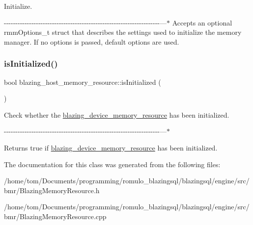 Initialize. 

-\/-\/-\/-\/-\/-\/-\/-\/-\/-\/-\/-\/-\/-\/-\/-\/-\/-\/-\/-\/-\/-\/-\/-\/-\/-\/-\/-\/-\/-\/-\/-\/-\/-\/-\/-\/-\/-\/-\/-\/-\/-\/-\/-\/-\/-\/-\/-\/-\/-\/-\/-\/-\/-\/-\/-\/-\/-\/-\/-\/-\/-\/-\/-\/-\/-\/-\/-\/---$\ast$ Accepts an optional rmm\+Options\+\_\+t struct that describes the settings used to initialize the memory manager. If no {\ttfamily options} is passed, default options are used.\mbox{\label{classblazing__host__memory__resource_a863f02392dbfc839f87b8b3a2a6cff9e}} 
\subsubsection{\texorpdfstring{is\+Initialized()}{isInitialized()}}
{\footnotesize\ttfamily bool blazing\+\_\+host\+\_\+memory\+\_\+resource\+::is\+Initialized (\begin{DoxyParamCaption}{ }\end{DoxyParamCaption})}



Check whether the \hyperlink{classblazing__device__memory__resource}{blazing\+\_\+device\+\_\+memory\+\_\+resource} has been initialized. 

-\/-\/-\/-\/-\/-\/-\/-\/-\/-\/-\/-\/-\/-\/-\/-\/-\/-\/-\/-\/-\/-\/-\/-\/-\/-\/-\/-\/-\/-\/-\/-\/-\/-\/-\/-\/-\/-\/-\/-\/-\/-\/-\/-\/-\/-\/-\/-\/-\/-\/-\/-\/-\/-\/-\/-\/-\/-\/-\/-\/-\/-\/-\/-\/-\/-\/-\/-\/---$\ast$ \begin{DoxyReturn}{Returns}
true if \hyperlink{classblazing__device__memory__resource}{blazing\+\_\+device\+\_\+memory\+\_\+resource} has been initialized. 
\end{DoxyReturn}


The documentation for this class was generated from the following files\+:\begin{DoxyCompactItemize}
\item 
/home/tom/\+Documents/programming/romulo\+\_\+blazingsql/blazingsql/engine/src/bmr/Blazing\+Memory\+Resource.\+h\item 
/home/tom/\+Documents/programming/romulo\+\_\+blazingsql/blazingsql/engine/src/bmr/Blazing\+Memory\+Resource.\+cpp\end{DoxyCompactItemize}
